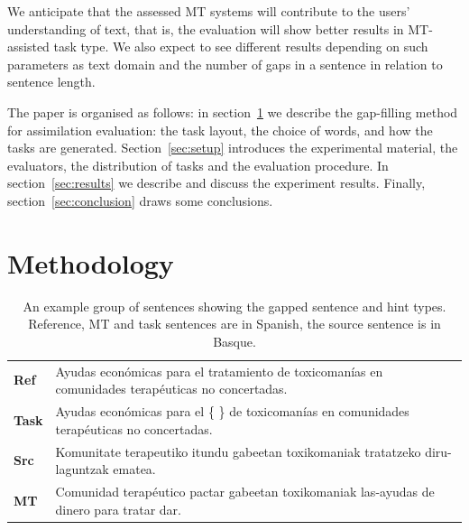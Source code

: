 \documentclass[11pt]{article}
\newcommand{\comment}[1]{\marginpar{\scriptsize\sf \textcolor{blue}{#1}}}
\begin{document}
We anticipate that the assessed MT systems will contribute to the users' understanding of text, that is, the evaluation will show better results in MT-assisted task type.\comment{MLF: this last sentence is very hard to follow} We also expect to see different results depending on such parameters as text domain and the number of gaps in a sentence in relation to sentence length.

The paper is organised as follows: in section~\ref{sec:methodology} we describe the gap-filling method for assimilation evaluation: the task layout, the choice of words, and how the tasks are generated. Section~\ref{sec:setup} introduces the experimental material, the evaluators, the distribution of tasks and the evaluation procedure. In section~\ref{sec:results} we describe and discuss the experiment results. Finally, section~\ref{sec:conclusion} draws some conclusions.


\section{Methodology}
\label{sec:methodology}

\begin{table}
  \begin{tabular}{|l|l|}
     \hline
     \textbf{Ref}   & Ayudas econ\'{o}micas para el tratamiento de toxicoman\'{i}as en comunidades terap\'{e}uticas no concertadas. \\
     \textbf{Task}   & Ayudas econ\'{o}micas para el \{ \} de toxicoman\'{i}as en comunidades terap\'{e}uticas no concertadas. \\
     \textbf{Src} & Komunitate terapeutiko itundu gabeetan toxikomaniak tratatzeko diru-laguntzak ematea. \\
     \textbf{MT}     & Comunidad terap\'{e}utico pactar gabeetan toxikomaniak las-ayudas de dinero para tratar dar. \\
     \hline
  \end{tabular}
  \caption{An example group of sentences showing the gapped sentence and hint types. Reference, MT and task sentences are in Spanish, the source sentence is in Basque.} 
  \label{table:example}
\end{table}
\end{document}
